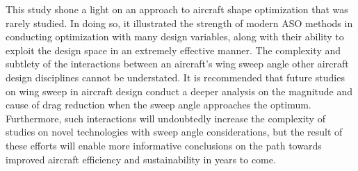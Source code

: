 This study shone a light on an approach to aircraft shape optimization that was rarely studied. In doing so, it illustrated the strength of modern ASO methods in conducting optimization with many design variables, along with their ability to exploit the design space in an extremely effective manner. The complexity and subtlety of the interactions between an aircraft's wing sweep angle other aircraft design disciplines cannot be understated. It is recommended that future studies on wing sweep in aircraft design conduct a deeper analysis on the magnitude and cause of drag reduction when the sweep angle approaches the optimum. Furthermore, such interactions will undoubtedly increase the complexity of studies on novel technologies with sweep angle considerations, but the result of these efforts will enable more informative conclusions on the path towards improved aircraft efficiency and sustainability in years to come.